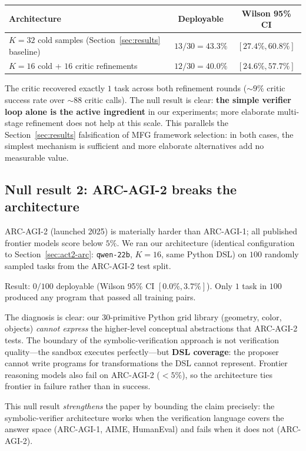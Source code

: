 \documentclass[11pt]{amsart}
\newcommand\1{{\mathds{1}}}
\theoremstyle{definition}
\theoremstyle{remark}
\numberwithin{equation}{section}
\begin{document}
\begin{center}\small
\begin{tabular}{lcc}
\toprule
Architecture & Deployable & Wilson 95\% CI \\
\midrule
$K\!=\!32$ cold samples (Section~\ref{sec:results} baseline) & $13/30 = 43.3\%$ & $[27.4\%, 60.8\%]$ \\
$K\!=\!16$ cold + $16$ critic refinements & $12/30 = 40.0\%$ & $[24.6\%, 57.7\%]$ \\
\bottomrule
\end{tabular}
\end{center}

The critic recovered exactly $1$ task across both refinement rounds ($\sim\!9\%$ critic success rate over $\sim\!88$ critic calls).
The null result is clear: \textbf{the simple verifier loop alone is the active ingredient} in our experiments; more elaborate multi-stage refinement does not help at this scale.
This parallels the Section~\ref{sec:results} falsification of MFG framework selection: in both cases, the simplest mechanism is sufficient and more elaborate alternatives add no measurable value.

\subsection{Null result 2: ARC-AGI-2 breaks the architecture}\label{sec:act2-arc2}

ARC-AGI-2 (launched 2025) is materially harder than ARC-AGI-1; all published frontier models score below $5\%$.
We ran our architecture (identical configuration to Section~\ref{sec:act2-arc}: \texttt{qwen-22b}, $K\!=\!16$, same Python DSL) on $100$ randomly sampled tasks from the ARC-AGI-2 test split.

Result: $0/100$ deployable (Wilson 95\% CI $[0.0\%, 3.7\%]$).
Only $1$ task in $100$ produced any program that passed all training pairs.

The diagnosis is clear: our $30$-primitive Python grid library (geometry, color, objects) \emph{cannot express} the higher-level conceptual abstractions that ARC-AGI-2 tests.
The boundary of the symbolic-verification approach is not verification quality---the sandbox executes perfectly---but \textbf{DSL coverage}: the proposer cannot write programs for transformations the DSL cannot represent.
Frontier reasoning models also fail on ARC-AGI-2 ($<5\%$), so the architecture ties frontier in failure rather than in success.

This null result \emph{strengthens} the paper by bounding the claim precisely: the symbolic-verifier architecture works when the verification language covers the answer space (ARC-AGI-1, AIME, HumanEval) and fails when it does not (ARC-AGI-2).
\end{document}
